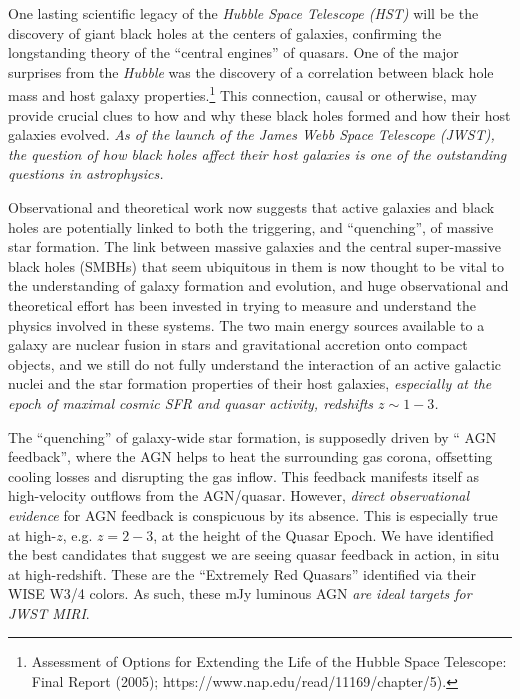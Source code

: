 One lasting scientific legacy of the {\it Hubble Space Telescope
(HST)} will be the discovery of giant black holes at the centers of
galaxies, confirming the longstanding theory of the ``central
engines'' of quasars.  One of the major surprises from the {\it
Hubble} was the discovery of a correlation between black hole mass and
host galaxy properties.\footnote{Assessment of Options for Extending
the Life of the Hubble Space Telescope: Final Report (2005);
https://www.nap.edu/read/11169/chapter/5).}  This connection, causal
or otherwise, may provide crucial clues to how and why these black
holes formed and how their host galaxies evolved. {\it As of the
launch of the James Webb Space Telescope (JWST), the question of how
black holes affect their host galaxies is one of the outstanding
questions in astrophysics.}

\smallskip \smallskip
\noindent
Observational and theoretical work now suggests that active galaxies
and black holes are potentially linked to both the triggering, and
``quenching'', of massive star formation. The link between massive
galaxies and the central super-massive black holes (SMBHs) that seem
ubiquitous in them is now thought to be vital to the understanding of
galaxy formation and evolution, and huge observational and
theoretical effort has been invested in trying to measure and
understand the physics involved in these systems.  The two
main energy sources available to a galaxy are nuclear fusion in stars
and gravitational accretion onto compact objects, and we still do not
fully understand the interaction of an active galactic nuclei and the
star formation properties of their host galaxies, {\it especially at
the epoch of maximal cosmic SFR and quasar activity, redshifts $z\sim1-3$.}

\smallskip \smallskip
\noindent
The ``quenching'' of galaxy-wide star formation, is supposedly driven
by `` AGN feedback'', where the AGN helps to heat the surrounding gas
corona, offsetting cooling losses and disrupting the gas inflow. This
feedback manifests itself as high-velocity outflows from the
AGN/quasar.  However, {\it direct observational evidence} for AGN
feedback is conspicuous by its absence. This is especially true at
high-$z$, e.g. $z=2-3$, at the height of the Quasar Epoch.  We have
identified the best candidates that suggest we are seeing quasar
feedback in action, in situ at high-redshift. These are the
``Extremely Red Quasars'' identified via their WISE W3/4 colors.  As
such, these mJy luminous AGN {\it are ideal targets for JWST
MIRI}.


